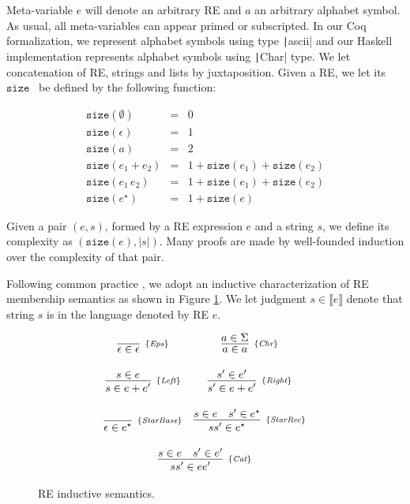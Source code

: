 \documentclass[oneside,12pt]{scrbook}
\newcommand{\haskell}[1]{\texttt|#1|}
\theoremstyle{definition}
\newcommand{\Eps}{\textit{Eps}}
\newcommand{\Chr}{\textit{Chr}}
\newcommand{\Catt}{\textit{Cat}}
\newcommand{\Left}{\textit{Left}}
\newcommand{\Right}{\textit{Right}}
\newcommand{\StarBase}{\textit{StarBase}}
\newcommand{\StarRec}{\textit{StarRec}}
\newcommand{\sembrackets}[1]{\ensuremath{\llbracket #1 \rrbracket}}
\newcommand{\size}{\ensuremath{\texttt{size}}}
\newcommand{\coq}[1]{\texttt|#1|}
\theoremstyle{plain}
\theoremstyle{definition}
\begin{document}
Meta-variable $e$ will denote an arbitrary RE and $a$ an
arbitrary alphabet symbol. As usual, all meta-variables can appear primed or subscripted. In our Coq formalization, we represent alphabet symbols using type \coq{ascii} and our Haskell implementation represents alphabet symbols using \haskell{Char} type. We let concatenation
of RE, strings and lists by juxtaposition. Given a RE, we let its \size~ be defined by the following 
function:


\[
\begin{array}{lcl}
\size(\emptyset) & = & 0 \\
\size(\epsilon)  & = & 1 \\
\size(a)         & = & 2 \\
\size(e_1 + e_2) & = & 1 + \size(e_1) + \size(e_2)\\
\size(e_1\,e_2)  & = & 1 + \size(e_1) + \size(e_2)\\
\size(e ^\star)  & = & 1 + \size(e)
\end{array}
\]

Given a pair $(e,s)$, formed by a RE expression $e$ and a string $s$, we define its complexity as $(\size(e),|s|)$. Many proofs are made by well-founded induction over the complexity of that pair.

Following common practice \cite{Lopes2016,Ribeiro2017,Rathnayake2011}, we adopt an inductive
characterization of RE membership semantics as shown in Figure \ref{figure:resemantics}. We let judgment $s \in \sembrackets{e}$ denote
that string $s$ is in the language denoted by RE $e$.

\begin{figure}[h]
	\[
	\begin{array}{cc}
	\infer[_{\{\Eps\}}]
	{\epsilon \in {\epsilon}}{} &
	\infer[_{\{\Chr\}}]
	{a \in {a}}{a \in \Sigma} \\ \\
	\infer[_{\{\Left\}}]
	{s \in {e + e'}}{s \in e} &
	\infer[_{\{\Right\}}]
	{s' \in {e + e'}}{s' \in {e'}} \\ \\
	\infer[_{\{\StarBase\}}]
	{\epsilon \in {e^\star}}{} &
	\infer[_{\{\StarRec\}}]
	{ss' \in {e^\star}}
	{s \in {e} & s' \in {e^\star}} \\ \\
	\multicolumn{2}{c}{
		\infer[_{\{\Catt\}}]
		{ss' \in {ee'}}
		{s \in {e} & s' \in {e'}}
	} \\
	\end{array}
	\]
	\centering
	\caption{RE inductive semantics.}
	\label{figure:resemantics}
\end{figure}
\end{document}
